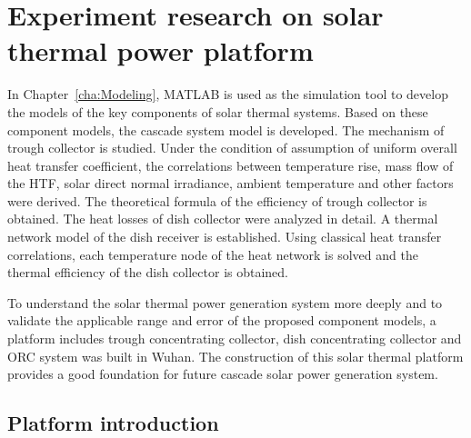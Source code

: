 \chapter{Experiment research on solar thermal power platform}

In Chapter~\ref{cha:Modeling}, MATLAB is used as the simulation tool to develop the models of the key components of solar thermal systems. Based on these component models, the cascade system model is developed.
The mechanism of trough collector is studied. Under the condition of assumption of uniform overall heat transfer coefficient, the correlations between temperature rise, mass flow of the HTF, solar direct normal irradiance, ambient temperature and other factors were derived. The theoretical formula of the efficiency of trough collector is obtained.
The heat losses of dish collector were analyzed in detail. A thermal network model of the dish receiver is established. Using classical heat transfer correlations, each temperature node of the heat network is solved and the thermal efficiency of the dish collector is obtained.

To understand the solar thermal power generation system more deeply and to validate the applicable range and error of the proposed component models, a platform includes trough concentrating collector, dish concentrating collector and ORC system was built in Wuhan. The construction of this solar thermal platform provides a good foundation for future cascade solar power generation system.

\section{Platform introduction}

